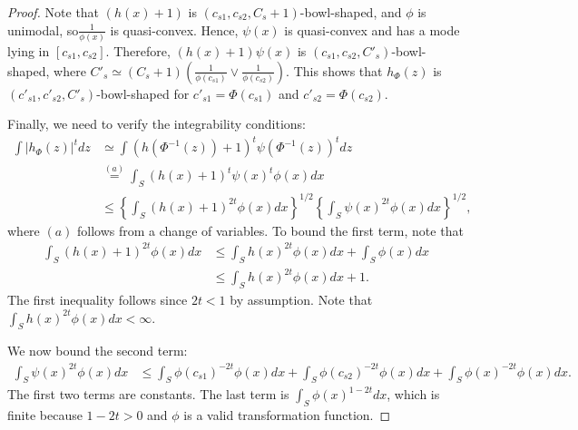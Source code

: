 \documentclass{article}
\begin{document}
\begin{proof}

Note that $(h(x) + 1)$ is $(c_{s1}, c_{s2}, C_s + 1)$-bowl-shaped, and $\phi$ is unimodal, so$\frac{1}{\phi(x)}$ is quasi-convex. Hence, $\psi(x)$ is quasi-convex and has a mode lying in $[c_{s1}, c_{s2}]$. Therefore, $(h(x) + 1) \psi(x)$ is $(c_{s1}, c_{s2}, C'_s)$-bowl-shaped, where 
$C'_s \simeq (C_s + 1) \left( \frac{1}{\phi(c_{s1})} \vee \frac{1}{\phi(c_{s2})} \right)$. This shows that $h_{\Phi}(z)$ is $(c'_{s1}, c'_{s2}, C'_s)$-bowl-shaped for $c'_{s1} = \Phi(c_{s1})$ and $c'_{s2} = \Phi(c_{s2})$. 

Finally, we need to verify the integrability conditions:
\begin{align*}
\int |h_{\Phi}(z)|^t dz &\simeq 
        \int  (h(\Phi^{-1}(z)) + 1)^t \psi( \Phi^{-1}(z))^t  dz \\
     &\stackrel{(a)} =  \int_S (h(x) + 1)^t \psi(x)^t \phi(x) dx \\
   &\leq \left\{ \int_S (h(x) + 1)^{2t} \phi(x) dx  \right\}^{1/2} 
         \left\{ \int_S \psi(x)^{2t}\phi(x) dx \right\}^{1/2},
\end{align*}
where $(a)$ follows from a change of variables. To bound the first term, note that
\begin{align*}
 \int_S (h(x) + 1)^{2t} \phi(x) dx &\leq \int_S h(x)^{2t} \phi(x) dx + \int_S \phi(x) dx \\
    &\leq \int_S h(x)^{2t} \phi(x) dx + 1.
\end{align*}
The first inequality follows since $2t < 1$ by assumption. Note that $\int_S h(x)^{2t} \phi(x) dx < \infty$.

We now bound the second term:
\begin{align*}
\int_S \psi(x)^{2t} \phi(x) dx &\leq  \int_S \phi(c_{s1})^{-2t} \phi(x) dx +
           \int_S \phi(c_{s2})^{-2t} \phi(x) dx +  
           \int_S \phi(x)^{-2t} \phi(x) dx.
\end{align*}
The first two terms are constants. The last term is $\int_S \phi(x)^{1-2t} dx$, which is finite because $1 - 2t > 0$ and $\phi$ is a valid transformation function. 
\end{proof}

\end{document}
